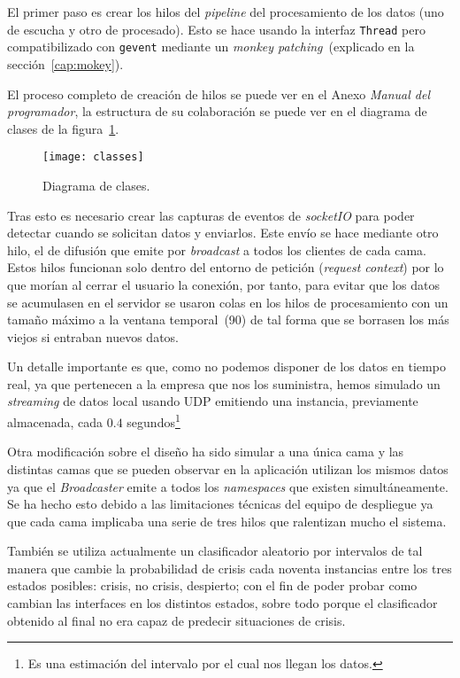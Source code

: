 El primer paso es crear los hilos del \textit{pipeline} del procesamiento de los datos (uno de escucha y otro de procesado). Esto se hace usando la interfaz \texttt{Thread} pero compatibilizado con \texttt{gevent} mediante un \textit{monkey patching}~(explicado en la sección~\ref{cap:mokey}).

El proceso completo de creación de hilos se puede ver en el Anexo \textit{Manual del programador}, la estructura de su colaboración se puede ver en el diagrama de clases de la figura~\ref{fig:classes}.

\begin{figure}
	\centering
	\texttt{[image: classes]}
	\caption{Diagrama de clases.}
	\label{fig:classes}
\end{figure}

Tras esto es necesario crear las capturas de eventos de \textit{socketIO} para poder detectar cuando se solicitan datos y enviarlos. Este envío se hace mediante otro hilo, el de difusión que emite por \textit{broadcast} a todos los clientes de cada cama. Estos hilos funcionan solo dentro del entorno de petición (\textit{request context}) por lo que morían al cerrar el usuario la conexión, por tanto, para evitar que los datos se acumulasen en el servidor se usaron colas en los hilos de procesamiento con un tamaño máximo a la ventana temporal~(90) de tal forma que se borrasen los más viejos si entraban nuevos datos.

Un detalle importante es que, como no podemos disponer de los datos en tiempo real, ya que pertenecen a la empresa que nos los suministra, hemos simulado un \textit{streaming} de datos local usando UDP emitiendo una instancia, previamente almacenada, cada $0.4$ segundos\footnote{Es una estimación del intervalo por el cual nos llegan los datos.}

Otra modificación sobre el diseño ha sido simular a una única cama y las distintas camas que se pueden observar en la aplicación utilizan los mismos datos ya que el \textit{Broadcaster} emite a todos los \textit{namespaces} que existen simultáneamente. Se ha hecho esto debido a las limitaciones técnicas del equipo de despliegue ya que cada cama implicaba una serie de tres hilos que ralentizan mucho el sistema.

También se utiliza actualmente un clasificador aleatorio por intervalos de tal manera que cambie la probabilidad de crisis cada noventa instancias entre los tres estados posibles: crisis, no crisis, despierto; con el fin de poder probar como cambian las interfaces en los distintos estados, sobre todo porque el clasificador obtenido al final no era capaz de predecir situaciones de crisis.

